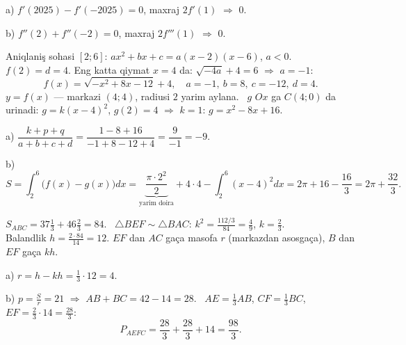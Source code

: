 a) $f'(2025)-f'(-2025)=0$, maxraj $2f'(1)$ $\Rightarrow$ $0$.

b) $f''(2)+f''(-2)=0$, maxraj $2f'''(1)$ $\Rightarrow$ $0$.

\newpage
{}
Aniqlaniş sohasi $[2;6]$: $ax^2+bx+c=a(x-2)(x-6)$, $a<0$. \ $f(2)=d=4$. Eng katta qiymat $x=4$ da: $\sqrt{-4a}+4=6$ $\Rightarrow$ $a=-1$:
\[f(x)=\sqrt{-x^2+8x-12}+4,\quad a=-1,\ b=8,\ c=-12,\ d=4.\]
$y=f(x)$ — markazi $(4;4)$, radiusi $2$ yarim aylana. \ $g$ $Ox$ ga $C(4;0)$ da urinadi: $g=k(x-4)^2$, $g(2)=4$ $\Rightarrow$ $k=1$: $g=x^2-8x+16$.

a) $\dfrac{k+p+q}{a+b+c+d}=\dfrac{1-8+16}{-1+8-12+4}=\dfrac9{-1}=-9$.

b) \[S=\int_2^6\bigl(f(x)-g(x)\bigr)dx=\underbrace{\frac{\pi\cdot2^2}2}_{\text{yarim doira}}+4\cdot4-\int_2^6(x-4)^2dx=2\pi+16-\frac{16}3=2\pi+\frac{32}3.\]

\newpage
{}
$S_{ABC}=37\frac13+46\frac23=84$. \ $\triangle BEF\sim\triangle BAC$: $k^2=\frac{112/3}{84}=\frac49$, $k=\frac23$.\\
Balandlik $h=\frac{2\cdot84}{14}=12$. $EF$ dan $AC$ gaça masofa $r$ (markazdan asosgaça), $B$ dan $EF$ gaça $kh$.

a) $r=h-kh=\frac13\cdot12=4$.

b) $p=\frac Sr=21$ $\Rightarrow$ $AB+BC=42-14=28$. \ $AE=\frac13AB$, $CF=\frac13BC$, $EF=\frac23\cdot14=\frac{28}3$:
\[P_{AEFC}=\frac{28}3+\frac{28}3+14=\frac{98}3.\]

